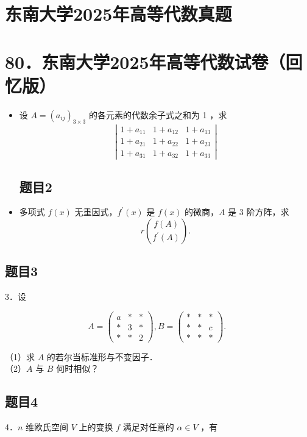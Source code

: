 \documentclass{article}
\begin{document}
\section*{东南大学2025年高等代数真题}
\section*{80．东南大学2025年高等代数试卷（回忆版）}
\begin{itemize}

\subsection{题目1}
  \item[1．] 设 \(A=\left(a_{i j}\right)_{3 \times 3}\) 的各元素的代数余子式之和为 1 ，求
\[
\left|\begin{array}{lll}
1+a_{11} & 1+a_{12} & 1+a_{13} \\
1+a_{21} & 1+a_{22} & 1+a_{23} \\
1+a_{31} & 1+a_{32} & 1+a_{33}
\end{array}\right|
\]

\subsection{题目2}
  \item[2．] 多项式 \(f(x)\) 无重因式，\(f^{\prime}(x)\) 是 \(f(x)\) 的微商，\(A\) 是 3 阶方阵，求
\[
r\binom{f(A)}{f^{\prime}(A)} .
\]
\end{itemize}

\subsection{题目3}
3．设

\[
A=\left(\begin{array}{lll}
a & * & * \\
* & 3 & * \\
* & * & 2
\end{array}\right), B=\left(\begin{array}{lll}
* & * & * \\
* & * & c \\
* & * & *
\end{array}\right) \text {. }
\]

（1）求 \(A\) 的若尔当标准形与不变因子．\\
（2）\(A\) 与 \(B\) 何时相似？

\subsection{题目4}
4．\(n\) 维欧氏空间 \(V\) 上的变换 \(f\) 满足对任意的 \(\alpha \in V\) ，有
\end{document}
